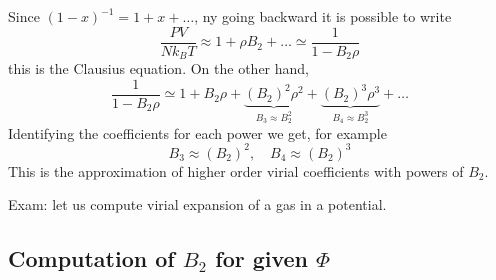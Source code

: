 \documentclass[../main/main.tex]{subfiles}
\begin{document}
Since \(  (1-x)^{-1} = 1 + x + \dots \), ny going backward it is possible to write
\begin{equation}
  \frac{PV}{N k_B T} \approx 1 + \rho B_2 + \dots \simeq \frac{1}{1-B_2 \rho }
\end{equation}
this is the Clausius equation. On the other hand,
\begin{equation}
  \frac{1}{1-B_2 \rho } \simeq  1 + B_2 \rho + \underbrace{(B_2)^2 \rho ^2}_{B_3 \approx B_2^2}  + \underbrace{(B_2)^3 \rho ^3}_{B_4 \approx B_2^3} + \dots
\end{equation}
Identifying the coefficients for each power we get, for example
\begin{equation}
  B_3 \approx (B_2)^2, \quad B_4 \approx (B_2)^3
\end{equation}
This is the approximation of higher order virial coefficients with powers of \( B_2 \).
\begin{example}{}{}
Exam: let us compute virial expansion of a gas in a potential.
\end{example}

\subsection{Computation of \( B_2 \) for given \( \Phi  \)}
\end{document}
